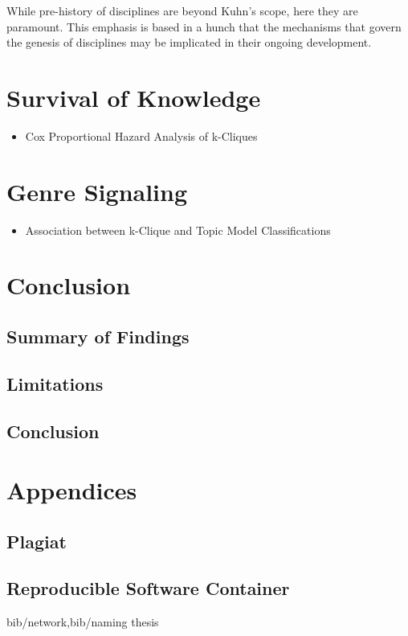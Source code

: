 \documentclass [PhD] {uclathes}
\providecommand{\tightlist}{
  \setlength{\itemsep}{0pt}\setlength{\parskip}{0pt}}
\begin{document}
While pre-history of disciplines are beyond Kuhn's scope, here they are
paramount. This emphasis is based in a hunch that the mechanisms that
govern the genesis of disciplines may be implicated in their ongoing
development.
 \chapter{Survival of Knowledge}
\begin{itemize}
\tightlist
\item
  Cox Proportional Hazard Analysis of k-Cliques
\end{itemize}
 \chapter{Genre Signaling}
\begin{itemize}
\tightlist
\item
  Association between k-Clique and Topic Model Classifications
\end{itemize}
 \chapter{Conclusion}
\section{Summary of Findings}\label{summary-of-findings}

\section{Limitations}\label{limitations}

\section{Conclusion}\label{conclusion}
 \chapter{Appendices}
\section{Plagiat}\label{plagiat}

\section{Reproducible Software
Container}\label{reproducible-software-container}
 
 {bib/network,bib/naming}    
 {thesis}
\end{document}
